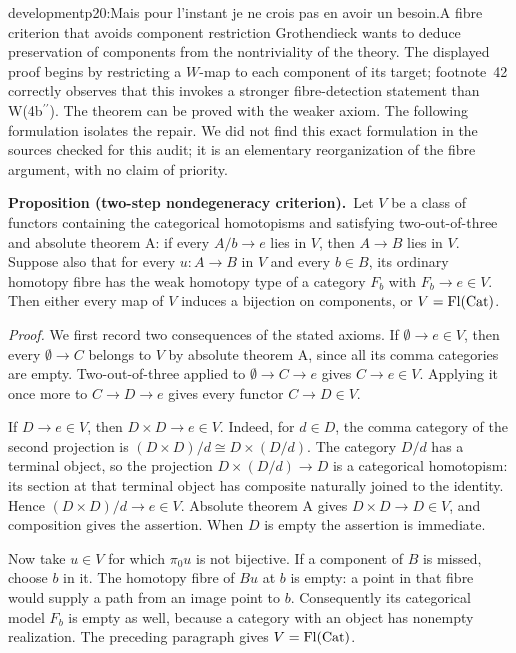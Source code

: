 \begin{dcomment}{development}{p20:Mais pour l'instant je ne crois pas en avoir un besoin.}{A fibre criterion that avoids component restriction}
Grothendieck wants to deduce preservation of components from the nontriviality of the theory. The displayed proof begins by restricting a \(W\)-map to each component of its target; footnote~42 correctly observes that this invokes a stronger fibre-detection statement than W(4b\(^{\prime\prime}\)). The theorem can be proved with the weaker axiom. The following formulation isolates the repair. We did not find this exact formulation in the sources checked for this audit; it is an elementary reorganization of the fibre argument, with no claim of priority.

\textbf{Proposition (two-step nondegeneracy criterion).}\ours\
Let \(V\) be a class of functors containing the categorical homotopisms and satisfying two-out-of-three and absolute theorem A: if every \(A/b\to e\) lies in \(V\), then \(A\to B\) lies in \(V\). Suppose also that for every \(u:A\to B\) in \(V\) and every \(b\in B\), its ordinary homotopy fibre has the weak homotopy type of a category \(F_b\) with \(F_b\to e\in V\). Then either every map of \(V\) induces a bijection on components, or \(V=\mathrm{Fl}(\mathrm{Cat})\).

\emph{Proof.}
We first record two consequences of the stated axioms. If \(\emptyset\to e\in V\), then every \(\emptyset\to C\) belongs to \(V\) by absolute theorem A, since all its comma categories are empty. Two-out-of-three applied to
\(\emptyset\to C\to e\) gives \(C\to e\in V\). Applying it once more to \(C\to D\to e\) gives every functor \(C\to D\in V\).

If \(D\to e\in V\), then \(D\times D\to e\in V\). Indeed, for \(d\in D\), the comma category of the second projection is
\((D\times D)/d\cong D\times(D/d)\).
The category \(D/d\) has a terminal object, so the projection \(D\times(D/d)\to D\) is a categorical homotopism: its section at that terminal object has composite naturally joined to the identity. Hence \((D\times D)/d\to e\in V\). Absolute theorem A gives \(D\times D\to D\in V\), and composition gives the assertion. When \(D\) is empty the assertion is immediate.

Now take \(u\in V\) for which \(\pi_0u\) is not bijective. If a component of \(B\) is missed, choose \(b\) in it. The homotopy fibre of \(Bu\) at \(b\) is empty: a point in that fibre would supply a path from an image point to \(b\). Consequently its categorical model \(F_b\) is empty as well, because a category with an object has nonempty realization. The preceding paragraph gives \(V=\mathrm{Fl}(\mathrm{Cat})\).


\end{dcomment}
